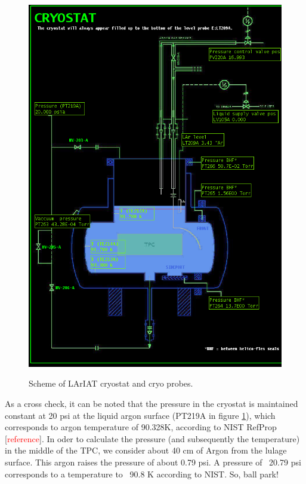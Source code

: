 \begin{figure}[ht!]
\centering
\includegraphics[scale=0.45]{./images/cryopic.png}\\
\caption{Scheme of LArIAT cryostat and cryo probes.}
\label{fig:cryo}
\end{figure}


As a cross check, it can be noted that the pressure in the cryostat is maintained constant at 20 psi at the liquid argon surface (PT219A in figure \ref{fig:cryo}), which corresponds to argon temperature of  90.328K,  according to NIST RefProp [\textcolor{red}{reference}]. In oder to calculate the pressure (and subsequently the temperature) in the middle of the TPC, we consider about 40 cm of Argon from the lulage surface. This argon raises the pressure of about 0.79 psi. A pressure of ~20.79 psi corresponds to a temperature to ~90.8 K according to NIST.  So, ball park!

